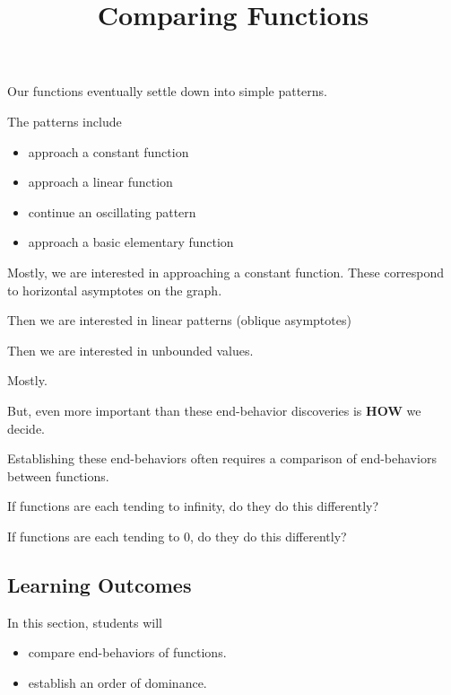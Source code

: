 \documentclass{ximera}
\title{Comparing Functions}
\begin{document}
\begin{abstract}
\end{abstract}
\maketitle







Our functions eventually settle down into simple patterns.  

The patterns include

\begin{itemize}
\item approach a constant function
\item approach a linear function
\item continue an oscillating pattern
\item approach a basic elementary function 
\end{itemize}


Mostly, we are interested in approaching a constant function.  These correspond to horizontal asymptotes on the graph.

Then we are interested in linear patterns (oblique asymptotes)

Then we are interested in unbounded values.

Mostly.


But, even more important than these end-behavior discoveries is \textbf{HOW} we decide.

Establishing these end-behaviors often requires a comparison of end-behaviors between functions.  


If functions are each tending to infinity, do they do this differently?


If functions are each tending to $0$, do they do this differently?















\subsection*{Learning Outcomes}


\begin{sectionOutcomes}
In this section, students will 

\begin{itemize}
\item compare end-behaviors of functions.
\item establish an order of dominance.
\end{itemize}
\end{sectionOutcomes}
\end{document}
